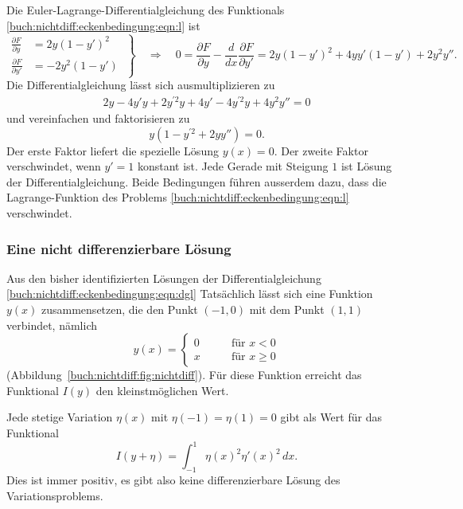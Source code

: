 Die Euler-Lagrange-Differentialgleichung des Funktionals
\eqref{buch:nichtdiff:eckenbedingung:eqn:l} ist
\begin{equation*}
\left.
\begin{aligned}
\frac{\partial F}{\partial y}
&=
2y(1-y')^2
\\
\frac{\partial F}{\partial y'}
&=
-2y^2(1-y')
\end{aligned}
\;
\right\}
\quad\Rightarrow\quad
0
=
\frac{\partial F}{\partial y}-\frac{d}{dx}\frac{\partial F}{\partial y'}
=
2y(1-y')^2
+4yy'(1-y') + 2y^2y''.
\end{equation*}
Die Differentialgleichung lässt sich ausmultiplizieren zu
\begin{align*}
2y
-4y'y
+
2y^{\prime 2}y
+
4y'
-
4y^{\prime 2}y
+
4y^2y''
=
0
\end{align*}
und vereinfachen und faktorisieren zu
\begin{equation}
y(1-y^{\prime 2}+2yy'')
=
0.
\label{buch:nichtdiff:eckenbedingung:eqn:dgl}
\end{equation}
Der erste Faktor liefert die spezielle Lösung $y(x)=0$.
Der zweite Faktor verschwindet, wenn $y'=1$ konstant ist.
Jede Gerade mit Steigung $1$ ist Lösung der Differentialgleichung.
Beide Bedingungen führen ausserdem dazu, dass die Lagrange-Funktion
des Problems
\eqref{buch:nichtdiff:eckenbedingung:eqn:l}
verschwindet.

%
%
\subsubsection{Eine nicht differenzierbare Lösung}

Aus den bisher identifizierten Lösungen der Differentialgleichung
\eqref{buch:nichtdiff:eckenbedingung:eqn:dgl}
Tatsächlich lässt sich eine Funktion $y(x)$ zusammensetzen,
die den Punkt $(-1,0)$ mit dem Punkt $(1,1)$ verbindet,
nämlich
\[
y(x)
=
\begin{cases}
0&\qquad \text{für $x<0$}\\
x&\qquad \text{für $x\ge 0$}
\end{cases}
\]
(Abbildung~\ref{buch:nichtdiff:fig:nichtdiff}).
Für diese Funktion erreicht das Funktional $I(y)$ den kleinstmöglichen
Wert.

Jede stetige Variation $\eta(x)$ mit $\eta(-1)=\eta(1)=0$ gibt als Wert
für das Funktional
\[
I(y+\eta)
=
\int_{-1}^1 \eta(x)^2 \eta'(x)^2 \,dx.
\]
Dies ist immer positiv, es gibt also keine differenzierbare Lösung
des Variationsproblems.

